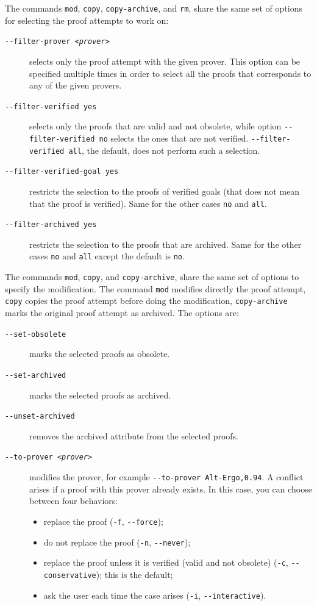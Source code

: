 The commands \texttt{mod}, \texttt{copy}, \texttt{copy-archive},
and \texttt{rm}, share the same set of options for selecting the proof
attempts to work on:
\begin{description}
\item[\texttt{-{}-filter-prover \textsl{<prover>}}] selects only the proof attempt with
  the given prover. This option can be specified multiple times in order
  to select all the proofs that corresponds to any of the given
  provers.
\item[\texttt{-{}-filter-verified yes}] selects only
  the proofs that are valid and not obsolete, while option
  \verb|--filter-verified no| selects the ones that are not verified.
  \verb|--filter-verified all|, the default, does not perform such a selection.
\item[\texttt{-{}-filter-verified-goal yes}] restricts the selection
  to the proofs of verified goals (that does not mean that the proof is
  verified). Same for the other cases \verb|no| and \verb|all|.
\item[\texttt{-{}-filter-archived yes}] restricts the selection
  to the proofs that are archived.
  Same for the other cases \verb|no|
  and \verb|all| except the default is \verb|no|.
\end{description}

\noindent
The commands \texttt{mod}, \texttt{copy}, and \texttt{copy-archive},
share the same set of options to specify the modification. The
command \texttt{mod} modifies directly the proof attempt,
\texttt{copy} copies the proof attempt before doing the modification,
\texttt{copy-archive} marks the original proof attempt as
archived.
The options are:
\begin{description}
\item[\texttt{-{}-set-obsolete}] marks the selected proofs as
  obsolete.
\item[\texttt{-{}-set-archived}] marks the selected proofs as archived.
\item[\texttt{-{}-unset-archived}] removes the archived attribute
  from the selected proofs.
\item[\texttt{-{}-to-prover \textsl{<prover>}}] modifies the prover, for example
  \texttt{-{}-to-prover Alt-Ergo,0.94}. A conflict arises if a proof
  with this prover already exists. In this case, you can choose between four
  behaviors:
\begin{itemize}
\item replace the proof (\verb|-f|, \verb|--force|);
\item do not replace the proof (\verb|-n|, \verb|--never|);
\item replace the proof unless it is verified (valid and not
  obsolete) (\verb|-c|, \verb|--conservative|); this is the default;
\item ask the user each time the case arises (\verb|-i|, \verb|--interactive|).
\end{itemize}
\end{description}

